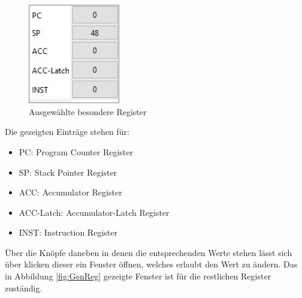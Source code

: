 \documentclass[12pt]{article}
\begin{document}
\begin{figure}[h]
\centering
\includegraphics[width=4cm]{bilder/Register}
\caption{Ausgewählte besondere Register}
\label{fig:Register}
\end{figure}

\noindent
Die gezeigten Einträge stehen für:\vspace{10pt}

\begin{itemize}
	\item PC: Program Counter Register
	\item SP: Stack Pointer Register
	\item ACC: Accumulator Register
	\item ACC-Latch: Accumulator-Latch Register
	\item INST: Instruction Register
\end{itemize}

\noindent
Über die Knöpfe daneben in denen die entsprechenden Werte stehen lässt sich über klicken dieser ein Fenster öffnen, welches erlaubt den Wert zu ändern.
Das in Abbildung \ref{fig:GenReg} gezeigte Fenster ist für die restlichen Register zuständig.\vspace{10pt}
\end{document}
